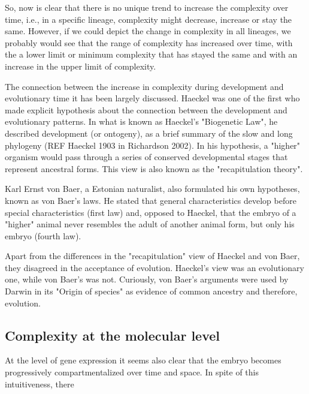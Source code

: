 So, now is clear that there is no unique trend to increase the complexity over time, i.e., in a specific lineage, complexity might decrease, increase or stay the same.
However, if we could depict the change in complexity in all lineages, we probably would see that the range of complexity has increased over time, with the a lower limit or minimum complexity that has stayed the same and with an increase in the upper limit of complexity\citep{Arthur2010}.


The connection between the increase in complexity during development and evolutionary time it has been largely discussed.
Haeckel was one of the first who made explicit hypothesis about the connection between the development and evolutionary patterns.
In what is known as Haeckel's "Biogenetic Law", he described development (or ontogeny), as a brief summary of the slow and long phylogeny (REF Haeckel 1903 in Richardson 2002).
In his hypothesis, a "higher" organism would pass through a series of conserved developmental stages that represent ancestral forms. This view is also known as the "recapitulation theory".

Karl Ernst von Baer, a Estonian naturalist, also formulated his own hypotheses, known as von Baer's laws. He stated that general characteristics develop before special characteristics (first law) and, opposed to Haeckel, that the embryo of a "higher" animal never resembles the adult of another animal form, but only his embryo (fourth law). 

Apart from the differences in the "recapitulation" view of Haeckel and von Baer\citep{Richardson2002}, they disagreed in the acceptance of evolution. Haeckel's view was an evolutionary one, while von Baer's was not. Curiously, von Baer's arguments were used by Darwin in its "Origin of species" as evidence of common ancestry and therefore, evolution.


	
\subsection{Complexity at the molecular level}


At the level of gene expression it seems also clear that the embryo becomes progressively compartmentalized over time and space. In spite of this intuitiveness, there
